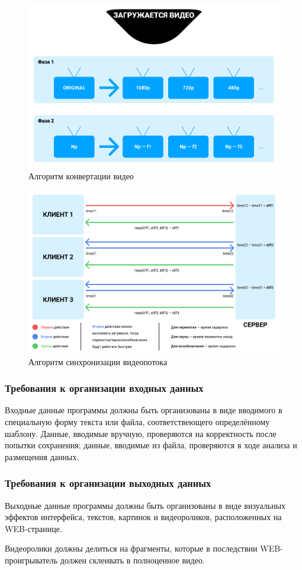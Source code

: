 \begin{figure}[p]
    \centering
    \includegraphics[width=0.97\linewidth]{images/server_converting.png}
    \caption{Алгоритм конвертации видео}
    \label{ris:server_converting}
\end{figure}

\begin{figure}[p]
    \centering
    \includegraphics[width=0.97\linewidth]{images/interaction_format.png}
    \caption{Алгоритм синхронизации видеопотока}
    \label{ris:interaction_format}
\end{figure}

\newpage

\subsubsection{Требования к организации входных данных}
Входные данные программы должны быть организованы в виде вводимого в специальную форму текста или файла,
соответствеющего определённому шаблону.
Данные, вводимые вручную, проверяются на корректность после попытки сохранения;
данные, вводимые из файла, проверяются в ходе анализа и размещения данных.

\subsubsection{Требования к организации выходных данных}
Выходные данные программы должны быть организованы в виде визуальных эффектов интерфейса, текстов, картинок и
видеороликов, расположенных на WEB-странице.

Видеоролики должны делиться на фрагменты, которые в последствии WEB-проигрыватель должен склеивать в полноценное видео.